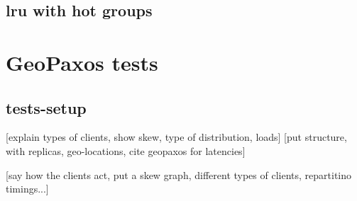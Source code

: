
\subsection{lru with hot groups}\label{sec:lru-hot-groups}

\section{GeoPaxos tests}\label{sec:geopaxos-tests}

\subsection{tests-setup}\label{sec:tests-setup}

[explain types of clients, show skew, type of distribution, loads]
[put structure, with replicas, geo-locations, cite geopaxos for latencies]

[say how the clients act, put a skew graph, different types of clients, repartitino timings...]